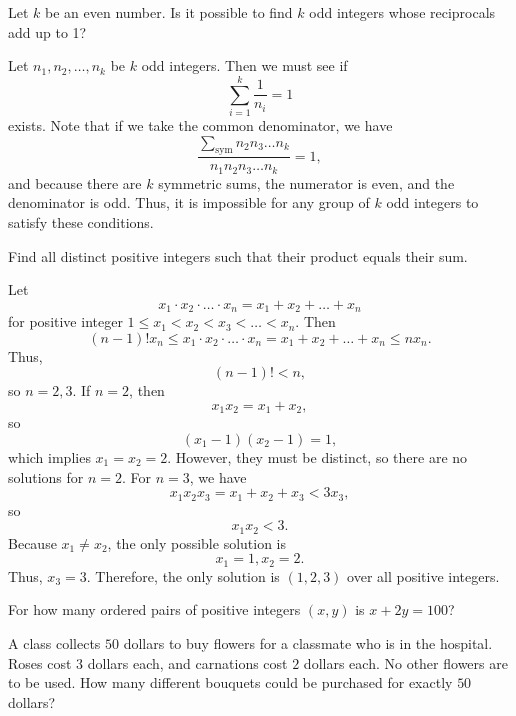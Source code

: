 \documentclass[mast]{lucky}
\begin{document}
\begin{exam}
Let $k$ be an even number. Is it possible to find $k$ odd integers whose reciprocals add up to 1?
\end{exam}
\begin{sol}
Let $n_1,n_2,\ldots,n_k$ be $k$ odd integers. Then we must see if
$$\sum_{i=1}^k \frac{1}{n_i} = 1$$
exists. Note that if we take the common denominator, we have
$$\frac{\sum_{\text{sym}} n_2n_3\ldots n_k}{n_1n_2n_3\ldots n_k} = 1,$$
and because there are $k$ symmetric sums, the numerator is even, and the denominator is odd. Thus, it is impossible for any group of $k$ odd integers to satisfy these conditions.
\end{sol}
\begin{exam}
Find all distinct positive integers such that their product equals their sum.
\end{exam}
\begin{sol}
Let
$$x_1 \cdot x_2 \cdot \ldots \cdot x_n = x_1 + x_2 + \ldots + x_n$$
for positive integer $1\le x_1 < x_2 < x_3 < \ldots < x_n$. Then
$$(n-1)! x_n \le x_1 \cdot x_2 \cdot \ldots \cdot x_n = x_1 + x_2 + \ldots + x_n \le nx_n.$$
Thus,
$$(n-1)! < n,$$
so $n=2,3$. If $n=2$, then
$$x_1x_2 = x_1 + x_2,$$
so
$$(x_1-1)(x_2-1) = 1,$$
which implies $x_1=x_2=2$. However, they must be distinct, so there are no solutions for $n=2$. For $n=3$, we have
$$x_1x_2x_3 = x_1+x_2+x_3<3x_3,$$
so
$$x_1x_2<3.$$
Because $x_1 \neq x_2$, the only possible solution is
$$x_1=1,x_2=2.$$
Thus, $x_3=3$. Therefore, the only solution is $(1,2,3)$ over all positive integers.
\end{sol}
\problems
{}


\begin{prob}[AMC 12A 2004/3]{1}

For how many ordered pairs of positive integers $(x,y)$ is $x+2y=100$?

\end{prob}

\begin{prob}[AMC 12B 2008/5]{1}

A class collects $50$ dollars to buy flowers for a classmate who is in the hospital. Roses cost $3$ dollars each, and carnations cost $2$ dollars each. No other flowers are to be used. How many different bouquets could be purchased for exactly $50$ dollars?

\end{prob}
\end{document}
